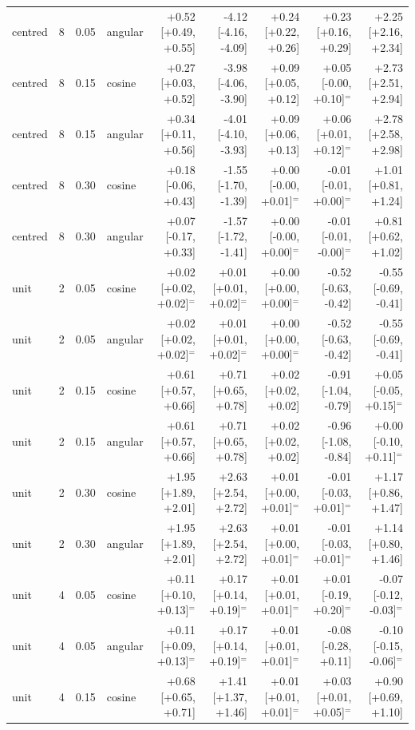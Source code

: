 \begin{tabular}{lrrlrrrrr}
centred & 8 & 0.05 & angular & +0.52 [+0.49, +0.55] & -4.12 [-4.16, -4.09] & +0.24 [+0.22, +0.26] & +0.23 [+0.16, +0.29] & +2.25 [+2.16, +2.34] \\
centred & 8 & 0.15 & cosine & +0.27 [+0.03, +0.52] & -3.98 [-4.06, -3.90] & +0.09 [+0.05, +0.12] & +0.05 [-0.00, +0.10]$^{=}$ & +2.73 [+2.51, +2.94] \\
centred & 8 & 0.15 & angular & +0.34 [+0.11, +0.56] & -4.01 [-4.10, -3.93] & +0.09 [+0.06, +0.13] & +0.06 [+0.01, +0.12]$^{=}$ & +2.78 [+2.58, +2.98] \\
centred & 8 & 0.30 & cosine & +0.18 [-0.06, +0.43] & -1.55 [-1.70, -1.39] & +0.00 [-0.00, +0.01]$^{=}$ & -0.01 [-0.01, +0.00]$^{=}$ & +1.01 [+0.81, +1.24] \\
centred & 8 & 0.30 & angular & +0.07 [-0.17, +0.33] & -1.57 [-1.72, -1.41] & +0.00 [-0.00, +0.00]$^{=}$ & -0.01 [-0.01, -0.00]$^{=}$ & +0.81 [+0.62, +1.02] \\
unit & 2 & 0.05 & cosine & +0.02 [+0.02, +0.02]$^{=}$ & +0.01 [+0.01, +0.02]$^{=}$ & +0.00 [+0.00, +0.00]$^{=}$ & -0.52 [-0.63, -0.42] & -0.55 [-0.69, -0.41] \\
unit & 2 & 0.05 & angular & +0.02 [+0.02, +0.02]$^{=}$ & +0.01 [+0.01, +0.02]$^{=}$ & +0.00 [+0.00, +0.00]$^{=}$ & -0.52 [-0.63, -0.42] & -0.55 [-0.69, -0.41] \\
unit & 2 & 0.15 & cosine & +0.61 [+0.57, +0.66] & +0.71 [+0.65, +0.78] & +0.02 [+0.02, +0.02] & -0.91 [-1.04, -0.79] & +0.05 [-0.05, +0.15]$^{=}$ \\
unit & 2 & 0.15 & angular & +0.61 [+0.57, +0.66] & +0.71 [+0.65, +0.78] & +0.02 [+0.02, +0.02] & -0.96 [-1.08, -0.84] & +0.00 [-0.10, +0.11]$^{=}$ \\
unit & 2 & 0.30 & cosine & +1.95 [+1.89, +2.01] & +2.63 [+2.54, +2.72] & +0.01 [+0.00, +0.01]$^{=}$ & -0.01 [-0.03, +0.01]$^{=}$ & +1.17 [+0.86, +1.47] \\
unit & 2 & 0.30 & angular & +1.95 [+1.89, +2.01] & +2.63 [+2.54, +2.72] & +0.01 [+0.00, +0.01]$^{=}$ & -0.01 [-0.03, +0.01]$^{=}$ & +1.14 [+0.80, +1.46] \\
unit & 4 & 0.05 & cosine & +0.11 [+0.10, +0.13]$^{=}$ & +0.17 [+0.14, +0.19]$^{=}$ & +0.01 [+0.01, +0.01]$^{=}$ & +0.01 [-0.19, +0.20]$^{=}$ & -0.07 [-0.12, -0.03]$^{=}$ \\
unit & 4 & 0.05 & angular & +0.11 [+0.09, +0.13]$^{=}$ & +0.17 [+0.14, +0.19]$^{=}$ & +0.01 [+0.01, +0.01]$^{=}$ & -0.08 [-0.28, +0.11] & -0.10 [-0.15, -0.06]$^{=}$ \\
unit & 4 & 0.15 & cosine & +0.68 [+0.65, +0.71] & +1.41 [+1.37, +1.46] & +0.01 [+0.01, +0.01]$^{=}$ & +0.03 [+0.01, +0.05]$^{=}$ & +0.90 [+0.69, +1.10] \\

\end{tabular}
